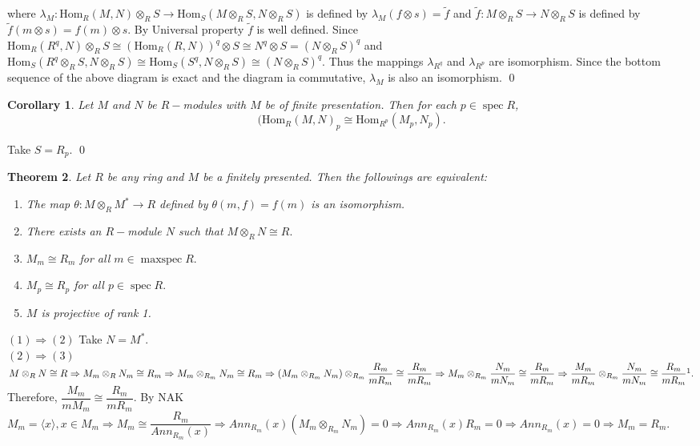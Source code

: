 \documentclass[11pt]{amsart}
\newtheorem{theorem}{Theorem}[section]
\newtheorem{corollary}[theorem]{Corollary}%
\newcommand{\gen}[1]{\langle#1\rangle}
\newcommand{\Hom}[1]{\text{Hom}_R\left(#1\right)}
\newcommand{\Homs}[1]{\text{Hom}_S\left(#1\right)}
\DeclareMathOperator{\spec}{\text{spec}}
\DeclareMathOperator{\mspec}{\text{maxspec}}
\begin{document}
where $\lambda_M: \Hom{M,N}\otimes_R S\to \Homs{M\otimes_R S,N\otimes_R S}$ is defined by $\lambda_M(f\otimes s)=\tilde{f}$ and $\tilde{f}:M\otimes_R S\to N\otimes_R S$ is defined by $\tilde{f}(m\otimes s)=f(m)\otimes s.$ By Universal property $\tilde{f}$ is well defined. Since $\Hom{R^q,N}\otimes_R S\cong (\Hom{R,N})^q\otimes S\cong N^q\otimes S=(N\otimes_R S)^q$ and $\Homs{R^q\otimes_R S,N\otimes_R S}\cong\Homs{S^q,N\otimes_R S}\cong (N\otimes_R S)^q.$ Thus the mappings $\lambda_{R^q}$ and $\lambda_{R^p}$ are isomorphism. Since the bottom sequence of the above diagram is exact and the diagram ia commutative, $\lambda_M$ is also an isomorphism. \qed

\begin{corollary}

Let $M$ and $N$ be $R-$modules with $M$ be of finite presentation. Then for each $p\in\spec R$, $$(\Hom{M,N}_p\cong \text{Hom}_{R^p}(M_p,N_p).$$

\end{corollary}

\proof Take $S=R_p.$ \qed


\begin{theorem}

Let $R$ be any ring and $M$ be a finitely presented. Then the followings are equivalent:
\begin{enumerate}

\item The map $\theta:M\otimes_R M^*\to R$ defined by $\theta(m,f)=f(m)$ is an isomorphism.

\item There exists an $R-$module $N$ such that $M\otimes_R N\cong R.$

\item $M_m\cong R_m$ for all $m\in\mspec R.$

\item $M_p\cong R_p$ for all $p\in \spec R.$

\item $M$ is projective of rank 1.

\end{enumerate}

\end{theorem}

\proof $(1)\Rightarrow (2)$ Take $N=M^*.$\\
$(2)\Rightarrow (3)$ $M\otimes_R N \cong R\Rightarrow M_m\otimes_R N_m \cong R_m \Rightarrow M_m\otimes_{R_m} N_m\cong R_m \Rightarrow (M_m\otimes_{R_m} N_m)\otimes_{R_m} \dfrac{R_m}{mR_m}\cong \dfrac{R_m}{mR_m}\Rightarrow M_m\otimes_{R_m} \dfrac{N_m}{mN_m}\cong \dfrac{R_m}{mR_m}\Rightarrow \dfrac{M_m}{mR_m}\otimes_{R_m} \dfrac{N_m}{mN_m}\cong \dfrac{R_m}{mR_m}\footnote{As $K(m):=\dfrac{R_m}{mR_m}$ and $K(m)^l\otimes_{K(m)} K(m)^s\cong K(m)^{ls}.$}.$ Therefore, $\dfrac{M_m}{mM_m}\cong \dfrac{R_m}{mR_m}.$ By NAK $M_m=\gen{x},x\in M_m \Rightarrow M_m\cong \dfrac{R_m}{Ann_{R_m}(x)} \Rightarrow Ann_{R_m}(x)(M_m\otimes_{R_m} N_m)=0 \Rightarrow Ann_{R_m}(x) R_m=0 \Rightarrow Ann_{R_m}(x)=0 \Rightarrow M_m=R_m.$\\
\end{document}
